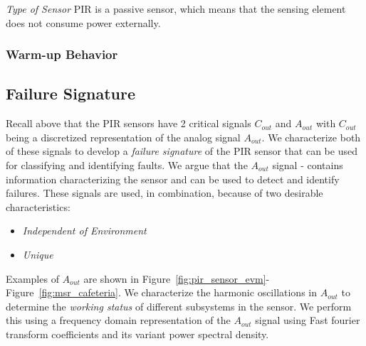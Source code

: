 
\textit{Type of Sensor} PIR is a passive sensor, which means that the sensing element does not consume power externally. 

\subsubsection{Warm-up Behavior} 

\subsection{Failure Signature} Recall above that the PIR sensors have 2 critical signals \viz $C_{out}$ and $A_{out}$ with $C_{out}$ being a discretized representation of the analog signal $A_{out}$. We characterize both of these signals to develop a \textit{failure signature} of the PIR sensor that can be used for classifying and identifying faults. We argue that the $A_{out}$ signal - \ca contains information characterizing the sensor and \cb can be used to detect and identify failures. These signals are used, in combination, because of two desirable characteristics:
\begin{itemize}
    \item \textit{Independent of Environment} 
    \item \textit{Unique}
\end{itemize}

Examples of $A_{out}$ are shown in Figure~\ref{fig:pir_sensor_evm}-Figure~\ref{fig:msr_cafeteria}. We characterize the harmonic oscillations in $A_{out}$ to determine the \textit{working status} of different subsystems in the sensor.  We perform this using a frequency domain representation of the $A_{out}$ signal using Fast fourier transform coefficients and its variant power spectral density. 

